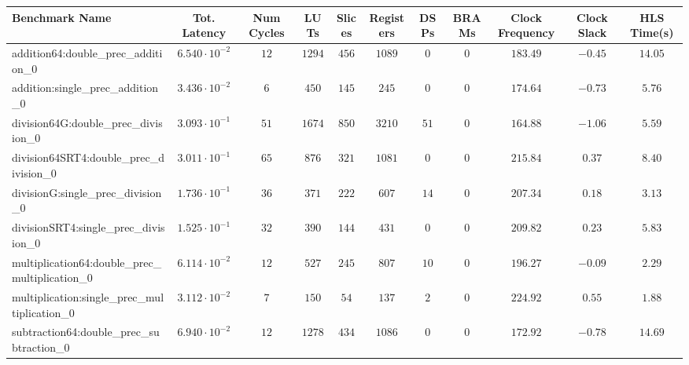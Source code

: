 \begin{tabular}{|l|c|c|c|c|c|c|c|c|c|c|}
\hline
Benchmark Name                                   & Tot. Latency            & Num Cycles & LUTs     & Slices   & Registers & DSPs   & BRAMs & Clock Frequency & Clock Slack & HLS Time(s) \\
\hline
addition64:double\_prec\_addition\_0             & $ 6.540 \cdot 10^{-2} $ & $ 12     $ & $ 1294 $ & $ 456  $ & $ 1089  $ & $ 0  $ & $ 0 $ & $ 183.49      $ & $ -0.45   $ & $ 14.05   $ \\
addition:single\_prec\_addition\_0               & $ 3.436 \cdot 10^{-2} $ & $ 6      $ & $ 450  $ & $ 145  $ & $ 245   $ & $ 0  $ & $ 0 $ & $ 174.64      $ & $ -0.73   $ & $ 5.76    $ \\
division64G:double\_prec\_division\_0            & $ 3.093 \cdot 10^{-1} $ & $ 51     $ & $ 1674 $ & $ 850  $ & $ 3210  $ & $ 51 $ & $ 0 $ & $ 164.88      $ & $ -1.06   $ & $ 5.59    $ \\
division64SRT4:double\_prec\_division\_0         & $ 3.011 \cdot 10^{-1} $ & $ 65     $ & $ 876  $ & $ 321  $ & $ 1081  $ & $ 0  $ & $ 0 $ & $ 215.84      $ & $ 0.37    $ & $ 8.40    $ \\
divisionG:single\_prec\_division\_0              & $ 1.736 \cdot 10^{-1} $ & $ 36     $ & $ 371  $ & $ 222  $ & $ 607   $ & $ 14 $ & $ 0 $ & $ 207.34      $ & $ 0.18    $ & $ 3.13    $ \\
divisionSRT4:single\_prec\_division\_0           & $ 1.525 \cdot 10^{-1} $ & $ 32     $ & $ 390  $ & $ 144  $ & $ 431   $ & $ 0  $ & $ 0 $ & $ 209.82      $ & $ 0.23    $ & $ 5.83    $ \\
multiplication64:double\_prec\_multiplication\_0 & $ 6.114 \cdot 10^{-2} $ & $ 12     $ & $ 527  $ & $ 245  $ & $ 807   $ & $ 10 $ & $ 0 $ & $ 196.27      $ & $ -0.09   $ & $ 2.29    $ \\
multiplication:single\_prec\_multiplication\_0   & $ 3.112 \cdot 10^{-2} $ & $ 7      $ & $ 150  $ & $ 54   $ & $ 137   $ & $ 2  $ & $ 0 $ & $ 224.92      $ & $ 0.55    $ & $ 1.88    $ \\
subtraction64:double\_prec\_subtraction\_0       & $ 6.940 \cdot 10^{-2} $ & $ 12     $ & $ 1278 $ & $ 434  $ & $ 1086  $ & $ 0  $ & $ 0 $ & $ 172.92      $ & $ -0.78   $ & $ 14.69   $ \\

\end{tabular}

